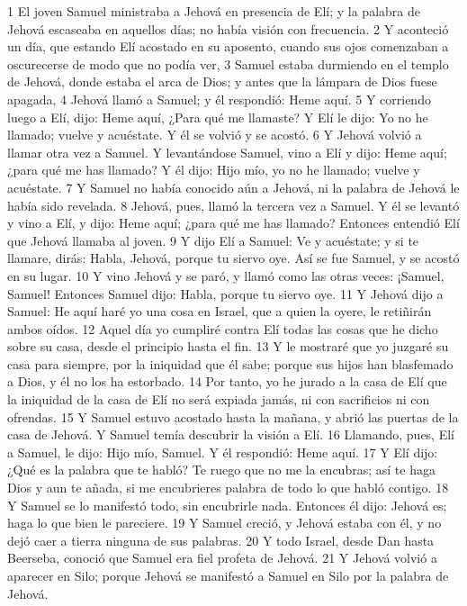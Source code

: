 1 El joven Samuel ministraba a Jehová en presencia de Elí; y la palabra de Jehová escaseaba en aquellos días; no había visión con frecuencia.
2 Y aconteció un día, que estando Elí acostado en su aposento, cuando sus ojos comenzaban a oscurecerse de modo que no podía ver,
3 Samuel estaba durmiendo en el templo de Jehová, donde estaba el arca de Dios; y antes que la lámpara de Dios fuese apagada,
4 Jehová llamó a Samuel; y él respondió: Heme aquí.
5 Y corriendo luego a Elí, dijo: Heme aquí, ¿Para qué me llamaste? Y Elí le dijo: Yo no he llamado; vuelve y acuéstate. Y él se volvió y se acostó.
6 Y Jehová volvió a llamar otra vez a Samuel. Y levantándose Samuel, vino a Elí y dijo: Heme aquí; ¿para qué me has llamado? Y él dijo: Hijo mío, yo no he llamado; vuelve y acuéstate.
7 Y Samuel no había conocido aún a Jehová, ni la palabra de Jehová le había sido revelada.
8 Jehová, pues, llamó la tercera vez a Samuel. Y él se levantó y vino a Elí, y dijo: Heme aquí; ¿para qué me has llamado? Entonces entendió Elí que Jehová llamaba al joven.
9 Y dijo Elí a Samuel: Ve y acuéstate; y si te llamare, dirás: Habla, Jehová, porque tu siervo oye. Así se fue Samuel, y se acostó en su lugar.
10 Y vino Jehová y se paró, y llamó como las otras veces: ¡Samuel, Samuel! Entonces Samuel dijo: Habla, porque tu siervo oye.
11 Y Jehová dijo a Samuel: He aquí haré yo una cosa en Israel, que a quien la oyere, le retiñirán ambos oídos.
12 Aquel día yo cumpliré contra Elí todas las cosas que he dicho sobre su casa, desde el principio hasta el fin.
13 Y le mostraré que yo juzgaré su casa para siempre, por la iniquidad que él sabe; porque sus hijos han blasfemado a Dios, y él no los ha estorbado.
14 Por tanto, yo he jurado a la casa de Elí que la iniquidad de la casa de Elí no será expiada jamás, ni con sacrificios ni con ofrendas.
15 Y Samuel estuvo acostado hasta la mañana, y abrió las puertas de la casa de Jehová. Y Samuel temía descubrir la visión a Elí.
16 Llamando, pues, Elí a Samuel, le dijo: Hijo mío, Samuel. Y él respondió: Heme aquí.
17 Y Elí dijo: ¿Qué es la palabra que te habló? Te ruego que no me la encubras; así te haga Dios y aun te añada, si me encubrieres palabra de todo lo que habló contigo.
18 Y Samuel se lo manifestó todo, sin encubrirle nada. Entonces él dijo: Jehová es; haga lo que bien le pareciere.
19 Y Samuel creció, y Jehová estaba con él, y no dejó caer a tierra ninguna de sus palabras.
20 Y todo Israel, desde Dan hasta Beerseba, conoció que Samuel era fiel profeta de Jehová.
21 Y Jehová volvió a aparecer en Silo; porque Jehová se manifestó a Samuel en Silo por la palabra de Jehová.

